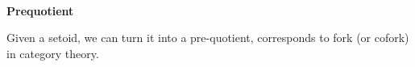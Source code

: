 {\begin{code}
\\
%
\\
\> \AgdaSymbol{:} \AgdaSymbol{\{} \AgdaSymbol{:} \AgdaSymbol{\}\{} \AgdaSymbol{:} \AgdaSymbol{\}\{}  \AgdaSymbol{:} \AgdaSymbol{\}(} \AgdaSymbol{:}   \AgdaSymbol{)\{} \AgdaSymbol{:} \AgdaSymbol{\}}\<%
\\
\>[0]\<[7]%
\>[7]   \AgdaBound{\_}  \AgdaSymbol{)}    \<%
\\
\>  \AgdaSymbol{=} \<%
\\
%
\\
\>\<\end{code}
}

\textbf{Prequotient}

Given a setoid, we can turn it into a pre-quotient, corresponds to 
fork (or cofork) in category theory.

